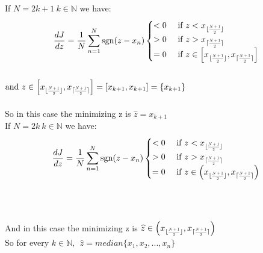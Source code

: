 \documentclass{article}
\DeclareMathOperator{\sgn}{sgn}
\begin{document}
If $N=2k+1 ~k \in \mathbb{N} $ we have: \\
\begin{align*}
\dfrac{dJ}{dz}=\frac{1}{N}\sum_{n=1}^{N}\sgn(z-x_n)
\begin{cases}
      <0 &  \text{ if } z < x_{\lfloor \scaleto{ \dfrac{N+1}{2} }{10pt} \rfloor} \\
      >0  &  \text{ if } z > x_{\lceil \scaleto{ \dfrac{N+1}{2} }{10pt} \rceil}\\
      =0  &  \text{ if } z \in  \left[x_{\lfloor \scaleto{ \dfrac{N+1}{2} }{10pt} \rfloor},x_{\lceil \scaleto{ \dfrac{N+1}{2} }{10pt} \rceil} \right]
    \end{cases}
\end{align*}\\
$\text{and } z \in  \left[x_{\lfloor \scaleto{ \dfrac{N+1}{2} }{10pt} \rfloor},x_{\lceil \scaleto{ \dfrac{N+1}{2} }{10pt} \rceil} \right]=\left[x_{k+1},x_{k+1} \right]=\lbrace x_{k+1}\rbrace $
\\
\\
So in this case the minimizing z is $\widehat{z}=x_{k+1}$
\\

If $N=2k ~k \in \mathbb{N} $ we have: \\
\begin{align*}
\dfrac{dJ}{dz}=\frac{1}{N}\sum_{n=1}^{N}\sgn(z-x_n)
\begin{cases}
      <0 &  \text{ if } z < x_{\lfloor \scaleto{ \dfrac{N+1}{2} }{10pt} \rfloor} \\
      >0  &  \text{ if } z > x_{\lceil \scaleto{ \dfrac{N+1}{2} }{10pt} \rceil}\\
      =0  &  \text{ if } z \in  \left(x_{\lfloor \scaleto{ \dfrac{N+1}{2} }{10pt} \rfloor},x_{\lceil \scaleto{ \dfrac{N+1}{2} }{10pt} \rceil} \right)
    \end{cases}
\end{align*}\\
\\
\\
And in this case the minimizing z is   $\widehat{z}\in  \left(x_{\lfloor \scaleto{ \dfrac{N+1}{2} }{10pt} \rfloor},x_{\lceil \scaleto{ \dfrac{N+1}{2} }{10pt} \rceil} \right)$
\\

So for every $k \in \mathbb{N} ,~~\widehat{z}=median\lbrace x_{1},x_{2},...,x_{n}\rbrace$ 


\vspace{1cm}
\end{document}

